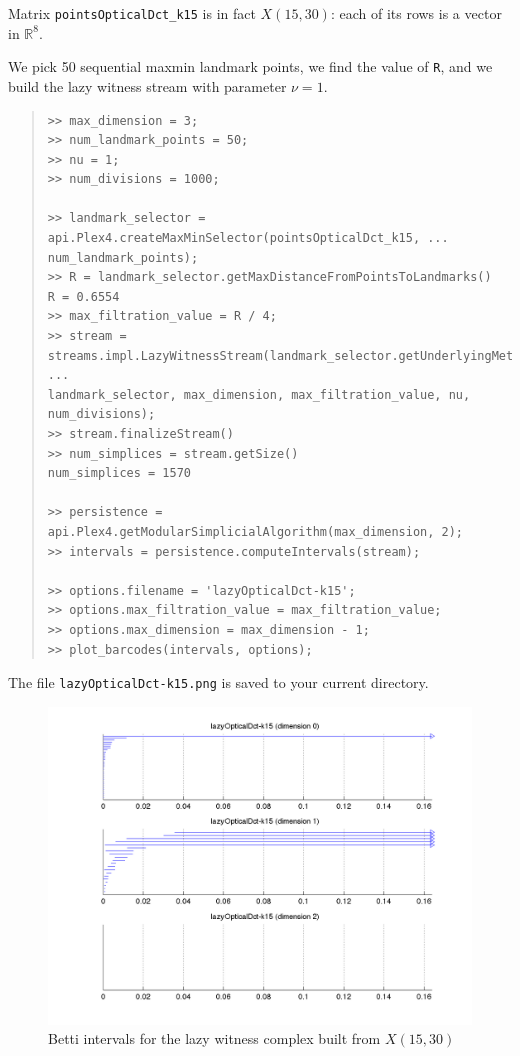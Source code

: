 \documentclass[amscd, amssymb, verbatim]{amsart}[12pt]
\theoremstyle{remark}
\theoremstyle{remark}
\theoremstyle{remark}
\newcommand{\R}{\mathbb{R}}
\begin{document}
Matrix \texttt{pointsOpticalDct\_k15} is in fact $X(15,30)$: each of its rows is a vector in $\R^8$.

We pick 50 sequential maxmin landmark points, we find the value of \texttt{R}, and we build the lazy witness stream with parameter $\nu = 1$. 

\begin{quote} \begin{verbatim}
>> max_dimension = 3;
>> num_landmark_points = 50;
>> nu = 1;
>> num_divisions = 1000;

>> landmark_selector = api.Plex4.createMaxMinSelector(pointsOpticalDct_k15, ...
num_landmark_points);
>> R = landmark_selector.getMaxDistanceFromPointsToLandmarks() 
R = 0.6554                         
>> max_filtration_value = R / 4;
>> stream = streams.impl.LazyWitnessStream(landmark_selector.getUnderlyingMetricSpace(), ...
landmark_selector, max_dimension, max_filtration_value, nu, num_divisions);
>> stream.finalizeStream()
>> num_simplices = stream.getSize()
num_simplices = 1570                         

>> persistence = api.Plex4.getModularSimplicialAlgorithm(max_dimension, 2);
>> intervals = persistence.computeIntervals(stream);

>> options.filename = 'lazyOpticalDct-k15';
>> options.max_filtration_value = max_filtration_value;
>> options.max_dimension = max_dimension - 1;
>> plot_barcodes(intervals, options);
\end{verbatim} \end{quote}

The file \texttt{lazyOpticalDct-k15.png} is saved to your current directory.

\begin{figure}[htp]
	\begin{center}
    	\includegraphics[width=6in]{lazyOpticalDct-k15.png}
   	\end{center}
	\caption{Betti intervals for the lazy witness complex built from $X(15,30)$}
  	\label{fig:rangeBetti}
\end{figure}
\FloatBarrier
\end{document}
